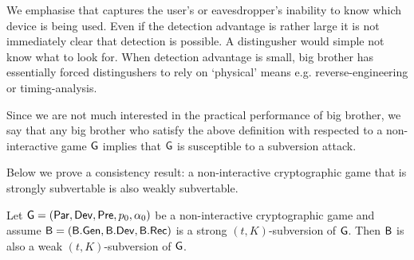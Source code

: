We emphasise that  captures the user's or eavesdropper's inability to know which device is being used. Even if the detection advantage is rather large it is not immediately clear that detection is possible. A distingusher would simple not know what to look for. When detection advantage is small, big brother has essentially forced distingushers to rely on `physical' means e.g. reverse-engineering or timing-analysis. 

Since we are not much interested in the practical performance of big brother, we say that any big brother who satisfy the above definition with respected to a non-interactive game $\operatorname{\mathsf{G}}$ implies that $\operatorname{\mathsf{G}}$ is susceptible to a subversion attack.

Below we prove a consistency result: a non-interactive cryptographic game that is strongly subvertable is also weakly subvertable.  

\begin{prop}
Let $\operatorname{\mathsf{G}}=\left(\operatorname{\mathsf{Par}},\operatorname{\mathsf{Dev}},\operatorname{\mathsf{Pre}},p_{0},\alpha_{0}\right)$ be a non-interactive cryptographic game and assume $\mathsf{B} = \left(\mathsf{B}.\mathsf{Gen},\mathsf{B}.\mathsf{Dev},\mathsf{B}.\mathsf{Rec}\right)$ is a strong $(t,K)$-subversion of $\operatorname{\mathsf{G}}$. Then $\mathsf{B}$ is also a weak $(t,K)$-subversion of $\operatorname{\mathsf{G}}$. 
\end{prop}

